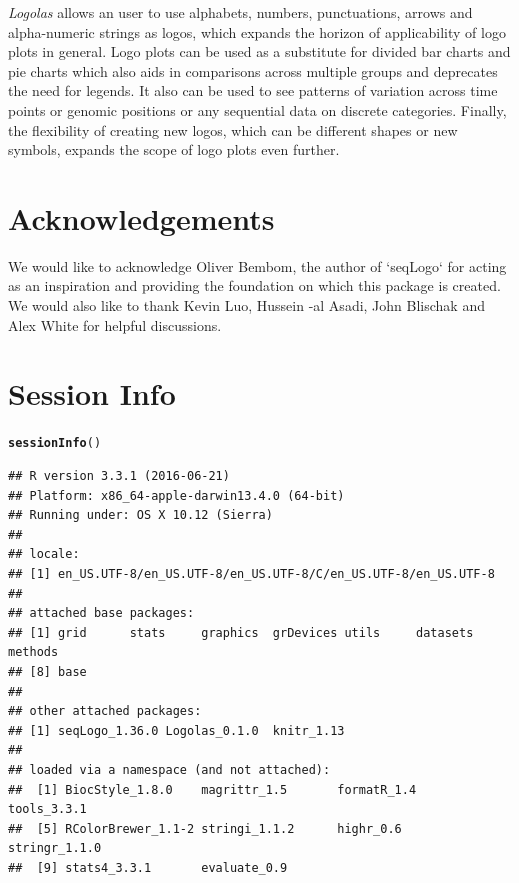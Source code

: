 \documentclass[12pt]{article}\usepackage[]{graphicx}\usepackage[usenames,dvipsnames]{color}
\makeatletter
\newcommand{\hlstd}[1]{\textcolor[rgb]{0.345,0.345,0.345}{#1}}%
\newcommand{\hlkwd}[1]{\textcolor[rgb]{0.737,0.353,0.396}{\textbf{#1}}}%
\newenvironment{kframe}{%
 \def\at@end@of@kframe{}%
 \ifinner\ifhmode%
  \def\at@end@of@kframe{\end{minipage}}%
  \begin{minipage}{\columnwidth}%
 \fi\fi%
 \def\FrameCommand##1{\hskip\@totalleftmargin \hskip-\fboxsep
 \colorbox{shadecolor}{##1}\hskip-\fboxsep
     \hskip-\linewidth \hskip-\@totalleftmargin \hskip\columnwidth}%
 \MakeFramed {\advance\hsize-\width
   \@totalleftmargin\z@ \linewidth\hsize
   \@setminipage}}%
 {\par\unskip\endMakeFramed%
 \at@end@of@kframe}
\newenvironment{knitrout}{}{} %
\newcommand{\Logolas}{\textit{Logolas}}
\makeatother
\begin{document}
\Logolas{} allows an user to use alphabets, numbers, punctuations, arrows and alpha-numeric strings as logos, which expands the horizon of applicability of logo plots in general. Logo plots can be used as a substitute for divided bar charts and pie charts which also aids in comparisons across multiple groups and deprecates the need for legends. It also can be used to see patterns of variation across time points or genomic positions or any sequential data on discrete categories. Finally, the flexibility of creating new logos, which can be different shapes or new symbols, expands the scope of logo plots even further.

\section{Acknowledgements}

We would like to acknowledge Oliver Bembom, the author of `seqLogo` for acting as an inspiration and providing the foundation on which this package is created. We would also like to thank Kevin Luo, Hussein -al Asadi, John Blischak and Alex White
for helpful discussions.

\section{Session Info}

\begin{knitrout}
\color{fgcolor}\begin{kframe}
\begin{alltt}
\hlkwd{sessionInfo}\hlstd{()}
\end{alltt}
\begin{verbatim}
## R version 3.3.1 (2016-06-21)
## Platform: x86_64-apple-darwin13.4.0 (64-bit)
## Running under: OS X 10.12 (Sierra)
## 
## locale:
## [1] en_US.UTF-8/en_US.UTF-8/en_US.UTF-8/C/en_US.UTF-8/en_US.UTF-8
## 
## attached base packages:
## [1] grid      stats     graphics  grDevices utils     datasets  methods  
## [8] base     
## 
## other attached packages:
## [1] seqLogo_1.36.0 Logolas_0.1.0  knitr_1.13    
## 
## loaded via a namespace (and not attached):
##  [1] BiocStyle_1.8.0    magrittr_1.5       formatR_1.4        tools_3.3.1       
##  [5] RColorBrewer_1.1-2 stringi_1.1.2      highr_0.6          stringr_1.1.0     
##  [9] stats4_3.3.1       evaluate_0.9
\end{verbatim}
\end{kframe}
\end{knitrout}
\end{document}
